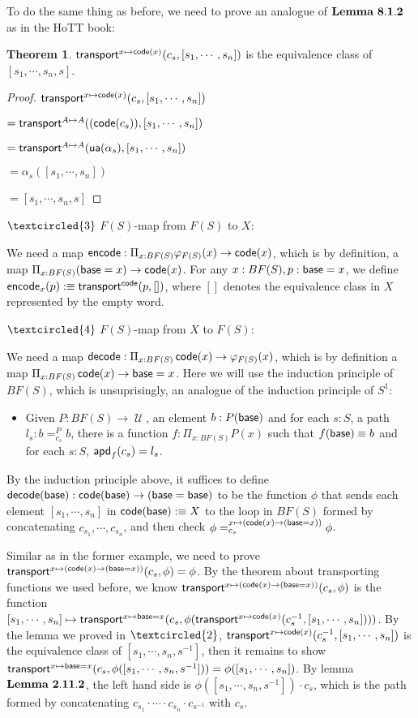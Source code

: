 \documentclass[11pt]{article}
\DeclareMathOperator{\cu}{\mathcal U}
\DeclareMathOperator{\base}{\sf base}
\DeclareMathOperator{\code}{\sf code}
\DeclareMathOperator{\ua}{\sf ua}
\DeclareMathOperator{\apd}{\sf apd}
\DeclareMathOperator{\encode}{\sf encode}
\DeclareMathOperator{\decode}{\sf decode}
\DeclareMathOperator{\transport}{\sf transport}
\theoremstyle{definition}
\newtheorem{theorem}{Theorem}[section]
\begin{document}
To do the same thing as before, we need to prove an analogue of $\bf Lemma \ 8.1.2$ as in the HoTT book:

\begin{theorem}
$\transport^{x\mapsto \code(x)}(c_s,[s_1,\cdots,s_n])$ is the equivalence class of $[s_1,\cdots,s_n,s]$.
\end{theorem}
\begin{proof}
   $\transport^{x\mapsto \code(x)}(c_s,[s_1,\cdots,s_n])$

   $= \transport^{A\mapsto A}((\code (c_s)),[s_1,\cdots,s_n])$

   $= \transport^{A\mapsto A}(\ua(\alpha_s),[s_1,\cdots,s_n])$

   $=\alpha_s([s_1,\cdots,s_n])$

   $=[s_1,\cdots,s_n,s]$
\end{proof}

$\textcircled{3}$ $F(S)$-map from $F(S)$ to $X$:

We need a map $\encode :\Pi_{x: BF(S)}\varphi_{F(S)}(x)\to \code (x)$, which is by definition, a map $\Pi_{x:BF(S)}(\base = x)\to \code (x)$. For any $x:BF(S),p:\base = x$, we define $\encode_x(p):\equiv \transport^{\code}(p,[])$, where $[]$ denotes the equivalence class in $X$ represented by the empty word.

$\textcircled{4}$ $F(S)$-map from $X$ to $F(S)$:

We need a map $\decode :\Pi_{x:BF(S)}\code (x)\to \varphi_{F(S)}(x)$, which is by definition a map $\Pi_{x:BF(S)}\code (x)\to \base = x$. Here we will use the induction principle of $BF(S)$, which is unsuprisingly, an analogue of the induction principle of $S^1$:
\begin{itemize}
\item Given $P: BF(S)\to \cu$, an element $b: P(\base)$ and for each $s:S$, a path $l_s:b=_{c_s}^Pb$, there is a function $f:\Pi_{x: BF(S)}P(x)$ such that $f(\base)\equiv b$ and for each $s: S$, $\apd_f(c_s)=l_s$.
\end{itemize}
By the induction principle above, it suffices to define $\decode (\base) : \code (\base) \to (\base = \base)$ to be the function $\phi$ that sends each element $[s_1,\cdots,s_n]$ in $\code(\base):\equiv X$ to the loop in $BF(S)$ formed by concatenating $c_{s_1},\cdots,c_{s_n}$, and then check $\phi=_{c_s}^{x\mapsto (\code (x)\to (\base = x))}\phi$. 

Similar as in the former example, we need to prove $\transport^{x\mapsto (\code(x)\to (\base = x))}(c_s,\phi)=\phi$. By the theorem about transporting functions we used before, we know $\transport^{x\mapsto (\code(x)\to (\base = x))}(c_s,\phi)$ is the function $[s_1,\cdots,s_n]\mapsto \transport^{x\mapsto \base = x}(c_s,\phi(\transport^{x\mapsto \code(x)}(c_s^{-1},[s_1,\cdots,s_n])))$. By the lemma we proved in $\textcircled{2}$, $\transport^{x\mapsto \code(x)}(c_s^{-1},[s_1,\cdots,s_n])$ is the equivalence class of $[s_1,\cdots,s_n,s^{-1}]$, then it remains to show $\transport^{x\mapsto \base = x}(c_s,\phi([s_1,\cdots,s_n,s^{-1}]))=\phi([s_1,\cdots,s_n])$. By lemma $\bf Lemma \ 2.11.2$, the left hand side is $\phi([s_1,\cdots,s_n,s^{-1}])\cdot c_s$, which is the path formed by concatenating $c_{s_1}\cdot \cdots  \cdot c_{s_n} \cdot c_{s^{-1}}$ with $c_s$.
\end{document}
